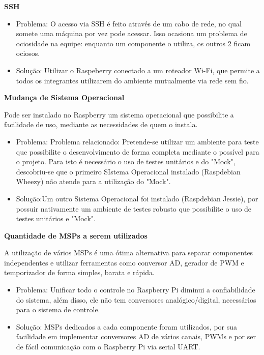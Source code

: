  \textbf{SSH}

 \begin{itemize}
      \item Problema:  O acesso via SSH é feito através de um cabo de rede, no qual somete uma máquina por vez pode acessar. Isso ocasiona um problema de ociosidade na equipe: enquanto um componente o utiliza, os outros 2 ficam ociosos.
	  \item Solução: Utilizar o Raspeberry conectado a um roteador Wi-Fi, que permite a todos os integrantes utilizarem do ambiente mutualmente via rede sem fio.
    \end{itemize}

  \textbf{Mudança de Sistema Operacional}

Pode ser instalado no Raspberry um sistema operacional que possibilite a facilidade de uso, mediante as necessidades de quem o instala.
 \begin{itemize}
      \item Problema:  Problema relacionado: Pretende-se utilizar um ambiente para teste que possibilite o desenvolvimento de forma completa mediante o possível para o projeto. Para isto é necessário o uso de testes unitários e do "Mock", descobriu-se que o primeiro SIstema Operacional instalado (Raspdebian Wheezy) não atende para a utilização do "Mock".

	  \item Solução:Um outro Sistema Operacional foi instalado (Raspdebian Jessie), por possuir nativamente um ambiente de testes robusto que possibilite o uso de testes unitários e "Mock".
    \end{itemize}

\textbf{Quantidade de MSPs a serem utilizados}

A utilização de vários MSPs é uma ótima alternativa para separar componentes independentes e utilizar ferramentas como conversor AD, gerador de PWM e temporizador de forma simples, barata e rápida.
 \begin{itemize}
      \item Problema: Unificar todo o controle no Raspberry Pi diminui a confiabilidade do sistema, além disso, ele não tem conversores analógico/digital, necessários para o sistema de controle.

	  \item Solução: MSPs dedicados a cada componente foram utilizados, por sua facilidade em implementar conversores AD de vários canais, PWMs e por ser de fácil comunicação com o Raspberry Pi via serial UART.

    \end{itemize}

